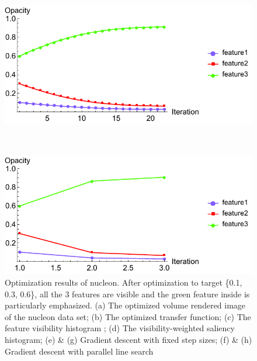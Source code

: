 \begin{figure}
	\begin{minipage}{.49\textwidth}
		\includegraphics[width=1\linewidth]{figures/nucleon_naive_proportional_opacity_fixed}
		\subcaption{}
	\end{minipage}~
	\begin{minipage}{.49\textwidth}
		\includegraphics[width=1\linewidth]{figures/nucleon_naive_proportional_opacity_parallelsearch}
		\subcaption{}
	\end{minipage}
	\caption[Optimization results of nucleon]{Optimization results of nucleon. After optimization to target \{0.1, 0.3, 0.6\}, all the 3 features are visible and the green feature inside is particularly emphasized. (a) The optimized volume rendered image of the nucleon data set; (b) The optimized transfer function; (c) The feature visibility histogram \cite{wang_efficient_2011}; (d) The visibility-weighted saliency histogram; (e) \& (g) Gradient descent with fixed step sizes; (f) \& (h) Gradient descent with parallel line search}
	\label{fig:nucleon_naive_optimized}
\end{figure}

